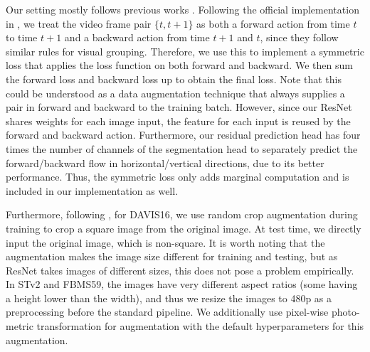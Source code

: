 Our setting mostly follows previous works \cite{liu2021emergence,choudhury2022guess}. Following the official implementation in \cite{liu2021emergence}, we treat the video frame pair $\{t, t+1\}$ as both a forward action from time $t$ to time $t+1$ and a backward action from time $t+1$ and $t$, since they follow similar rules for visual grouping. Therefore, we use this to implement a symmetric loss that applies the loss function on both forward and backward. We then sum the forward loss and backward loss up to obtain the final loss. Note that this could be understood as a data augmentation technique that always supplies a pair in forward and backward to the training batch. However, since our ResNet shares weights for each image input, the feature for each input is reused by the forward and backward action. Furthermore, our residual prediction head has four times the number of channels of the segmentation head to separately predict the forward/backward flow in horizontal/vertical directions, due to its better performance. Thus, the symmetric loss only adds marginal computation and is included in our implementation as well.

Furthermore, following \cite{liu2021emergence}, for DAVIS16, we use random crop augmentation during training to crop a square image from the original image. At test time, we directly input the original image, which is non-square. It is worth noting that the augmentation makes the image size different for training and testing, but as ResNet \cite{he2016deep} takes images of different sizes, this does not pose a problem empirically. In STv2 and FBMS59, the images have very different aspect ratios (some having a height lower than the width), and thus we resize the images to 480p as a preprocessing before the standard pipeline. We additionally use pixel-wise photo-metric transformation \cite{mmseg2020} for augmentation with the default hyperparameters for this augmentation.

